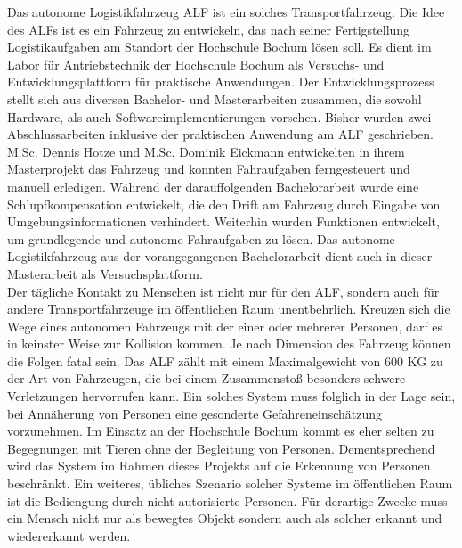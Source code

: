 		Das autonome Logistikfahrzeug ALF ist ein solches Transportfahrzeug. Die Idee des ALFs ist es ein Fahrzeug zu entwickeln, das nach seiner Fertigstellung Logistikaufgaben am Standort der Hochschule Bochum lösen soll. Es dient im Labor für Antriebstechnik der Hochschule Bochum als Versuchs- und Entwicklungsplattform für praktische Anwendungen. Der Entwicklungsprozess stellt sich aus diversen Bachelor- und Masterarbeiten zusammen, die sowohl Hardware, als auch Softwareimplementierungen vorsehen. Bisher wurden zwei Abschlussarbeiten inklusive der praktischen Anwendung am ALF geschrieben. M.Sc. Dennis Hotze und M.Sc. Dominik Eickmann entwickelten in ihrem Masterprojekt das Fahrzeug und konnten Fahraufgaben ferngesteuert und manuell erledigen. Während der darauffolgenden Bachelorarbeit wurde eine Schlupfkompensation entwickelt, die den Drift am Fahrzeug durch Eingabe von Umgebungsinformationen verhindert. Weiterhin wurden Funktionen entwickelt, um grundlegende und autonome Fahraufgaben zu lösen. Das autonome Logistikfahrzeug aus der vorangegangenen Bachelorarbeit dient auch in dieser Masterarbeit als Versuchsplattform.\\
		
		Der tägliche Kontakt zu Menschen ist nicht nur für den ALF, sondern auch für andere Transportfahrzeuge im öffentlichen Raum unentbehrlich. Kreuzen sich die Wege eines autonomen Fahrzeugs mit der einer oder mehrerer Personen, darf es in keinster Weise zur Kollision kommen. Je nach Dimension des Fahrzeug können die Folgen fatal sein. Das ALF zählt mit einem Maximalgewicht von 600 KG zu der Art von Fahrzeugen, die bei einem Zusammenstoß besonders schwere Verletzungen hervorrufen kann. Ein solches System muss folglich in der Lage sein, bei Annäherung von Personen eine gesonderte Gefahreneinschätzung vorzunehmen. Im Einsatz an der Hochschule Bochum kommt es eher selten zu Begegnungen mit Tieren ohne der Begleitung von Personen. Dementsprechend wird das System im Rahmen dieses Projekts auf die Erkennung von Personen beschränkt. Ein weiteres, übliches Szenario solcher Systeme im öffentlichen Raum ist die Bediengung durch nicht autorisierte Personen. Für derartige Zwecke muss ein Mensch nicht nur als bewegtes Objekt sondern auch als solcher erkannt und wiedererkannt werden. \\
		
